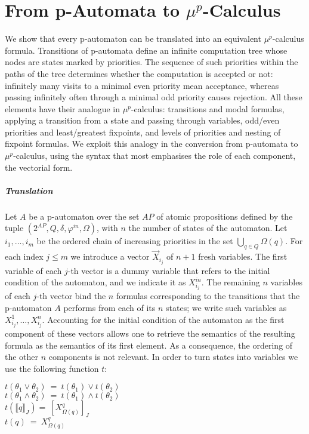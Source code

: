 \documentclass[a4paper,UKenglish]{oasics-v2016}
\begin{document}
\section{From p-Automata to $\mu^p$-Calculus}
We show that every p-automaton can be translated into an equivalent 
$\mu^p$-calculus formula.
Transitions of p-automata define an infinite computation tree whose nodes are 
states marked by priorities.
The sequence of such priorities within the paths of the tree determines whether 
the computation is accepted or not: infinitely many visits to a minimal even 
priority mean acceptance, whereas passing infinitely often through a minimal 
odd priority causes rejection.
All these elements have their analogue in $\mu^p$-calculus: transitions and 
modal formulas, applying a transition from a state and passing through 
variables, odd/even priorities and least/greatest fixpoints, and levels of 
priorities and nesting of fixpoint formulas.
We exploit this analogy in the conversion from p-automata to $\mu^p$-calculus, 
using the syntax that most emphasises the role of each component, the vectorial 
form.
%
\subparagraph{Translation}Let $A$ be a p-automaton over the set $AP$ of atomic 
propositions defined by the tuple $(2^{AP}, Q, \delta, \varphi^{in}, \Omega)$, 
with $n$ the number of states of the automaton.  
Let $i_1,\hdots,i_m$ be the ordered chain of increasing priorities in the set 
$\bigcup_{q\in Q}\Omega(q)$.
For each index $j\leq m$ we introduce a vector $\vec{X}_{i_j}$ of $n+1$ fresh 
variables.
The first variable of each $j$-th vector is a dummy variable that refers to the 
initial condition of the automaton, and we indicate it as $X^{in}_{i_j}$.
The remaining $n$ variables of each $j$-th vector bind the $n$ formulas 
corresponding to the transitions that the p-automaton $A$ performs from each of 
its $n$ states; we write such variables as $X^1_{i_j},\hdots,X^n_{i_j}$.
Accounting for the initial condition of the automaton as the first component of 
these vectors allows one to retrieve the semantics of the resulting formula as 
the semantics of its first element.
As a consequence, the ordering of the other $n$ components is not relevant.
In order to turn states into variables we use the following function $t$:
\begin{center}

$t(\theta_1 \vee \theta_2) \ =\ t(\theta_1) \vee t(\theta_2)$\\
$t(\theta_1 \wedge \theta_2) \ =\ t(\theta_1) \wedge t(\theta_2)$\\
$t(\llbracket q \rrbracket_J) =\ [X^q_{\Omega(q)}]_J$\\
$t(q) \ =\ X^q_{\Omega(q)}$\\
\end{center}
\end{document}
